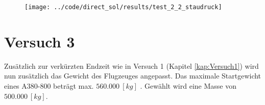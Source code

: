 \begin{figure}[H]
\begin{center}
\texttt{[image: ../code/direct\_sol/results/test\_2\_2\_staudruck]}
\label{img:test_2_2_staudruck}
\end{center}
\end{figure}




%













\newpage
\section{Versuch 3}\label{kap:Versuch3}
Zusätzlich zur verkürzten Endzeit wie in Versuch 1 (Kapitel \ref{kap:Versuch1}) wird nun zusätzlich das Gewicht des Flugzeuges angepasst. Das maximale Startgewicht eines A380-800 beträgt max. $560.000 \ [kg]$ \cite{A380Tech}. Gewählt wird eine Masse von $500.000 \ [kg]$.

